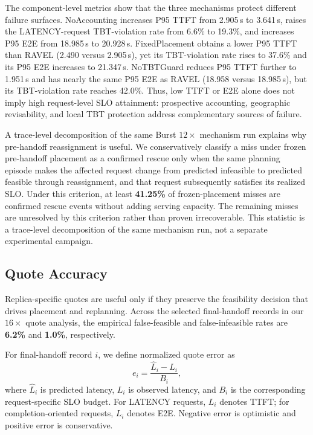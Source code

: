 \documentclass[letterpaper,twocolumn,10pt]{article}
\begin{document}
The component-level metrics show that the three mechanisms protect different
failure surfaces.
NoAccounting increases P95 TTFT from 2.905\,s to 3.641\,s, raises the
LATENCY-request TBT-violation rate from 6.6\% to 19.3\%, and increases P95 E2E
from 18.985\,s to 20.928\,s.
FixedPlacement obtains a lower P95 TTFT than RAVEL
(2.490 versus 2.905\,s), yet its TBT-violation rate rises to 37.6\% and its
P95 E2E increases to 21.347\,s.
NoTBTGuard reduces P95 TTFT further to 1.951\,s and has nearly the same P95 E2E
as RAVEL (18.958 versus 18.985\,s), but its TBT-violation rate reaches 42.0\%.
Thus, low TTFT or E2E alone does not imply high request-level SLO attainment:
prospective accounting, geographic revisability, and local TBT protection
address complementary sources of failure.

A trace-level decomposition of the same Burst $12\times$ mechanism run
explains why pre-handoff reassignment is useful.
We conservatively classify a miss under frozen pre-handoff placement as a
confirmed rescue only when the same planning episode makes the affected
request change from predicted infeasible to predicted feasible through
reassignment, and that request subsequently satisfies its realized SLO.
Under this criterion, at least \textbf{41.25\%} of frozen-placement misses are
confirmed rescue events without adding serving capacity.
The remaining misses are unresolved by this criterion rather than proven
irrecoverable.
This statistic is a trace-level decomposition of the same mechanism run, not a
separate experimental campaign.


\subsection{Quote Accuracy}
\label{sec:eval:quote}

Replica-specific quotes are useful only if they preserve the feasibility
decision that drives placement and replanning.
Across the selected final-handoff records in our $16\times$ quote analysis,
the empirical false-feasible and false-infeasible rates are
\textbf{6.2\%} and \textbf{1.0\%}, respectively.

For final-handoff record $i$, we define normalized quote error as
\[
    e_i =
    \frac{\widehat{L}_i-L_i}{B_i},
\]
where $\widehat{L}_i$ is predicted latency, $L_i$ is observed latency, and
$B_i$ is the corresponding request-specific SLO budget.
For LATENCY requests, $L_i$ denotes TTFT; for completion-oriented requests,
$L_i$ denotes E2E.
Negative error is optimistic and positive error is conservative.
\end{document}
